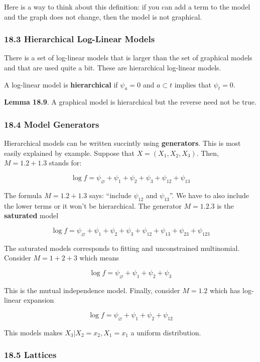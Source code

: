 Here is a way to think about this definition: if you can add a term to
the model and the graph does not change, then the model is not
graphical.

\subsubsection{18.3 Hierarchical Log-Linear Models}\label{hierarchical-log-linear-models}

There is a set of log-linear models that is larger than the set of
graphical models and that are used quite a bit. These are hierarchical
log-linear models.

A log-linear model is \textbf{hierarchical} if \(\psi_a = 0\) and
\(a \subset t\) implies that \(\psi_t = 0\).

\textbf{Lemma 18.9}. A graphical model is hierarchical but the reverse
need not be true.

\subsubsection{18.4 Model Generators}\label{model-generators}

Hierarchical models can be written succintly using \textbf{generators}.
This is most easily explained by example. Suppose that
\(X = (X_1, X_2, X_3)\). Then, \(M = 1.2 + 1.3\) stands for:

\[ \log f = \psi_\varnothing + \psi_1 + \psi_2 + \psi_3 + \psi_{12} + \psi_{13}\]

The formula \(M = 1.2 + 1.3\) says: ``include \(\psi_{12}\) and
\(\psi_{13}\)''. We have to also include the lower terms or it won't be
hierarchical. The generator \(M = 1.2.3\) is the \textbf{saturated}
model

\[ \log f = \psi_\varnothing + \psi_1 + \psi_2 + \psi_3 + \psi_{12} + \psi_{13} + \psi_{23} + \psi_{123}\]

The saturated models corresponds to fitting and unconstrained
multinomial. Consider \(M = 1 + 2 + 3\) which means

\[ \log f = \psi_\varnothing + \psi_1 + \psi_2 + \psi_3 \]

This is the mutual independence model. Finally, consider \(M = 1.2\)
which has log-linear expansion

\[ \log f = \psi_\varnothing + \psi_1 + \psi_2 + \psi_{12} \]

This models makes \(X_3 | X_2 = x_2, X_1 = x_1\) a uniform distribution.

\subsubsection{18.5 Lattices}\label{lattices}

